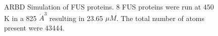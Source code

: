 \documentclass[12ptr]{article}
\begin{document}
\begin{figure}[!ht]
    \centering
    \qquad
    \caption {\small ARBD Simulation of FUS proteins. 8 FUS proteins were run at $450$K in a  825 $\mathring{A}^{3}$ resulting in 23.65 $\mu M$. The total number of atoms present were 43444.}
    \label{fig:fus_430}
\end{figure}
\end{document}

